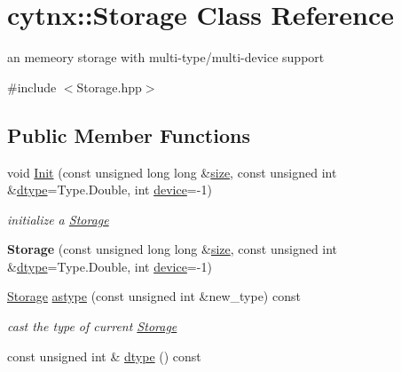 \hypertarget{classcytnx_1_1Storage}{}\section{cytnx\+:\+:Storage Class Reference}
\label{classcytnx_1_1Storage}


an memeory storage with multi-\/type/multi-\/device support  




{\ttfamily \#include $<$Storage.\+hpp$>$}

\subsection*{Public Member Functions}
\begin{DoxyCompactItemize}
\item 
void \hyperlink{classcytnx_1_1Storage_a6cf79f362c4ae68ab7623f0ebac9355e}{Init} (const unsigned long long \&\hyperlink{classcytnx_1_1Storage_aaf36262622abdab03c90b713c454f78e}{size}, const unsigned int \&\hyperlink{classcytnx_1_1Storage_a643824801e81ab86aca055f1dd1f34d7}{dtype}=Type.\+Double, int \hyperlink{classcytnx_1_1Storage_a4c3e27582d7f951e6b76ccbb92f7c537}{device}=-\/1)
\begin{DoxyCompactList}\small\item\em initialize a \hyperlink{classcytnx_1_1Storage}{Storage} \end{DoxyCompactList}\item 
\mbox{\label{classcytnx_1_1Storage_a281c06bd64e9ea3338083c18c4c32eda}} 
{\bfseries Storage} (const unsigned long long \&\hyperlink{classcytnx_1_1Storage_aaf36262622abdab03c90b713c454f78e}{size}, const unsigned int \&\hyperlink{classcytnx_1_1Storage_a643824801e81ab86aca055f1dd1f34d7}{dtype}=Type.\+Double, int \hyperlink{classcytnx_1_1Storage_a4c3e27582d7f951e6b76ccbb92f7c537}{device}=-\/1)
\item 
\hyperlink{classcytnx_1_1Storage}{Storage} \hyperlink{classcytnx_1_1Storage_a8310d8dbb70510272ded2e3d01be25f0}{astype} (const unsigned int \&new\+\_\+type) const
\begin{DoxyCompactList}\small\item\em cast the type of current \hyperlink{classcytnx_1_1Storage}{Storage} \end{DoxyCompactList}\item 
const unsigned int \& \hyperlink{classcytnx_1_1Storage_a643824801e81ab86aca055f1dd1f34d7}{dtype} () const

\end{DoxyCompactItemize}
